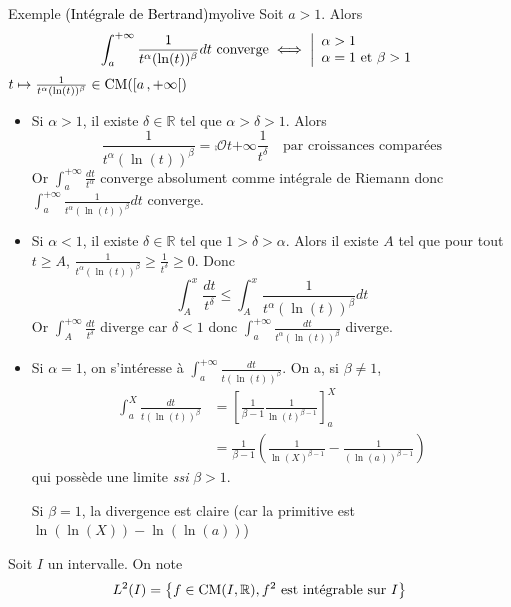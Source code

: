     \begin{omed}{Exemple \textcolor{black}{(Intégrale de Bertrand)}}{myolive}
        Soit $a > 1$. Alors 
        \[ \int_{a}^{+\infty} \frac{1}{t^{\alpha} (\ln(t))^{\beta}} dt \text{ converge} \iff \ou{\alpha > 1}{\alpha = 1 \text{ et } \beta > 1} \]  
        $t \mapsto \frac{1}{t^{\alpha} (\ln(t))^{\beta}} \in \operatorname{CM}(\left[ a \, , +\infty \right[)$  
        \begin{itemize}
            \item Si $\alpha > 1$, il existe $\delta \in \mathbb{R}$ tel que $\alpha > \delta > 1$. Alors 
            \[ \frac{1}{t^{\alpha} (\ln(t))^{\beta}} = \comp{\mathcal{O}}{t}{+\infty}{\frac{1}{t^{\delta}}} \quad \text{par croissances comparées} \]
            Or $\int_{a}^{+\infty} \frac{dt}{t^{\alpha}}$ converge absolument comme intégrale de Riemann donc $\int_{a}^{+\infty} \frac{1}{t^{\alpha} (\ln(t))^{\beta}} dt$ converge.
            \item Si $\alpha < 1$, il existe $\delta \in \mathbb{R}$ tel que $1 > \delta > \alpha$. Alors il existe $A$ tel que pour tout $t \geq A$, $\frac{1}{t^{\alpha} (\ln(t))^{\beta}}  \geq \frac{1}{t^{\delta}} \geq 0$. Donc 
            \[ \int_{A}^{x} \frac{dt}{t^{\delta}} \leq \int_{A}^{x} \frac{1}{t^{\alpha} (\ln(t))^{\beta}}  dt \]   
            Or $\int_{A }^{+\infty} \frac{dt}{t^{\delta}}$ diverge car $\delta < 1$ donc $\int_{a}^{+\infty} \frac{dt}{t^{\alpha} (\ln(t))^{\beta}}$ diverge.
            \item Si $\alpha = 1$, on s’intéresse à $\int_{a }^{+\infty} \frac{dt}{t (\ln(t))^{\beta}}$. On a, si $\beta \neq 1$, 
            \begin{align*}
                \int_{a}^{X} \frac{dt}{t(\ln(t))^{\beta}} 
                &= \left[\frac{1}{\beta-1} \frac{1}{\ln(t)^{\beta-1}}\right]_a^X \\
                &= \frac{1}{\beta-1} \left(\frac{1}{\ln(X)^{\beta-1}} - \frac{1}{ (\ln(a))^{\beta - 1}} \right)
            \end{align*}
            qui possède une limite \textit{ssi} $\beta > 1$.
            
            Si $\beta = 1$, la divergence est claire (car la primitive est $\ln(\ln(X)) - \ln(\ln(a))$)
        \end{itemize}
    \end{omed}

    \begin{defi}{}{}
        Soit $I$ un intervalle. On note 
        \[ L^2(I) = \left\{ f \in \operatorname{CM}(I,\mathbb{R}), f^2 \text{ est intégrable sur } I\right\} \]
    \end{defi}

